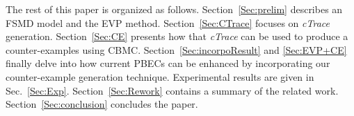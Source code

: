 The rest of this paper is organized as follows. Section~\ref{Sec:prelim} describes
an FSMD model and the EVP method.  Section~\ref{Sec:CTrace} focuses on
\textit{cTrace} generation.  Section~\ref{Sec:CE} presents how that \textit{cTrace} can be used
to produce a counter-examples using CBMC.
Section~\ref{Sec:incorpoResult} and \ref{Sec:EVP+CE} finally delve into how
current PBECs can be enhanced by incorporating our counter-example generation
technique. Experimental results are given in Sec.~\ref{Sec:Exp}.
Section~\ref{Sec:Rework} contains a summary of the related work.
Section~\ref{Sec:conclusion} concludes the paper.
